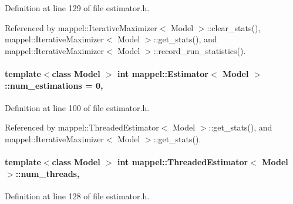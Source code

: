 Definition at line 129 of file estimator.\+h.



Referenced by mappel\+::\+Iterative\+Maximizer$<$ Model $>$\+::clear\+\_\+stats(), mappel\+::\+Iterative\+Maximizer$<$ Model $>$\+::get\+\_\+stats(), and mappel\+::\+Iterative\+Maximizer$<$ Model $>$\+::record\+\_\+run\+\_\+statistics().

\paragraph[{\texorpdfstring{num\+\_\+estimations}{num_estimations}}]{\setlength{\rightskip}{0pt plus 5cm}template$<$class Model $>$ int {\bf mappel\+::\+Estimator}$<$ Model $>$\+::num\+\_\+estimations = 0\hspace{0.3cm}{\ttfamily [protected]}, {\ttfamily [inherited]}}\hypertarget{classmappel_1_1Estimator_ab15b88435d6c50a68fac84465d950b12}{}\label{classmappel_1_1Estimator_ab15b88435d6c50a68fac84465d950b12}


Definition at line 100 of file estimator.\+h.



Referenced by mappel\+::\+Threaded\+Estimator$<$ Model $>$\+::get\+\_\+stats(), and mappel\+::\+Iterative\+Maximizer$<$ Model $>$\+::get\+\_\+stats().

\paragraph[{\texorpdfstring{num\+\_\+threads}{num_threads}}]{\setlength{\rightskip}{0pt plus 5cm}template$<$class Model $>$ int {\bf mappel\+::\+Threaded\+Estimator}$<$ Model $>$\+::num\+\_\+threads\hspace{0.3cm}{\ttfamily [protected]}, {\ttfamily [inherited]}}\hypertarget{classmappel_1_1ThreadedEstimator_a6afa05d7d971f3317ce1602de853123b}{}\label{classmappel_1_1ThreadedEstimator_a6afa05d7d971f3317ce1602de853123b}


Definition at line 128 of file estimator.\+h.



